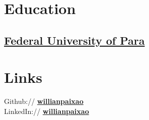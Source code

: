 \documentclass[]{willianpaixao-resume}
\begin{document}
\lastupdated



\begin{minipage}[t]{0.35\textwidth} 


\section{Education}

\subsection{\href{http://www.portal.ufpa.br/}{Federal University of Para}}
\sectionsep


\section{Links} 
Github:// \href{https://github.com/willianpaixao}{\bf willianpaixao} \\
LinkedIn://  \href{https://www.linkedin.com/in/willianpaixao}{\bf willianpaixao} \\
\sectionsep


\end{minipage}
\end{document}
